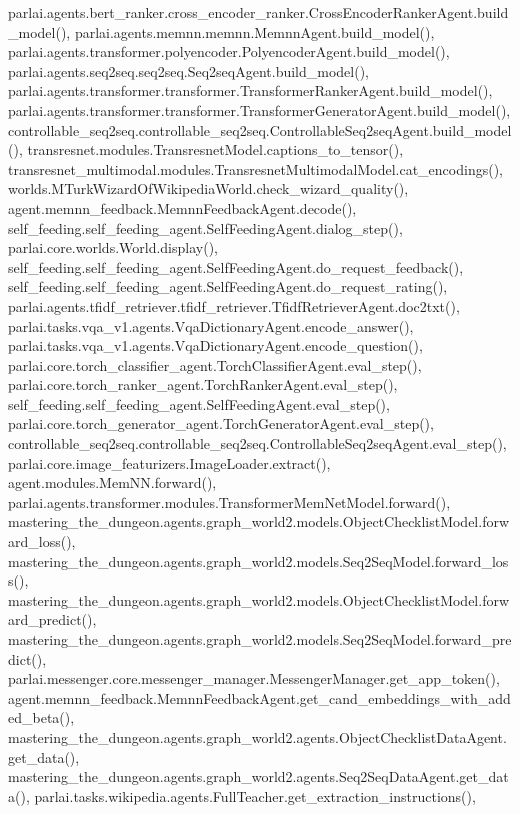parlai.\+agents.\+bert\+\_\+ranker.\+cross\+\_\+encoder\+\_\+ranker.\+Cross\+Encoder\+Ranker\+Agent.\+build\+\_\+model(), parlai.\+agents.\+memnn.\+memnn.\+Memnn\+Agent.\+build\+\_\+model(), parlai.\+agents.\+transformer.\+polyencoder.\+Polyencoder\+Agent.\+build\+\_\+model(), parlai.\+agents.\+seq2seq.\+seq2seq.\+Seq2seq\+Agent.\+build\+\_\+model(), parlai.\+agents.\+transformer.\+transformer.\+Transformer\+Ranker\+Agent.\+build\+\_\+model(), parlai.\+agents.\+transformer.\+transformer.\+Transformer\+Generator\+Agent.\+build\+\_\+model(), controllable\+\_\+seq2seq.\+controllable\+\_\+seq2seq.\+Controllable\+Seq2seq\+Agent.\+build\+\_\+model(), transresnet.\+modules.\+Transresnet\+Model.\+captions\+\_\+to\+\_\+tensor(), transresnet\+\_\+multimodal.\+modules.\+Transresnet\+Multimodal\+Model.\+cat\+\_\+encodings(), worlds.\+M\+Turk\+Wizard\+Of\+Wikipedia\+World.\+check\+\_\+wizard\+\_\+quality(), agent.\+memnn\+\_\+feedback.\+Memnn\+Feedback\+Agent.\+decode(), self\+\_\+feeding.\+self\+\_\+feeding\+\_\+agent.\+Self\+Feeding\+Agent.\+dialog\+\_\+step(), parlai.\+core.\+worlds.\+World.\+display(), self\+\_\+feeding.\+self\+\_\+feeding\+\_\+agent.\+Self\+Feeding\+Agent.\+do\+\_\+request\+\_\+feedback(), self\+\_\+feeding.\+self\+\_\+feeding\+\_\+agent.\+Self\+Feeding\+Agent.\+do\+\_\+request\+\_\+rating(), parlai.\+agents.\+tfidf\+\_\+retriever.\+tfidf\+\_\+retriever.\+Tfidf\+Retriever\+Agent.\+doc2txt(), parlai.\+tasks.\+vqa\+\_\+v1.\+agents.\+Vqa\+Dictionary\+Agent.\+encode\+\_\+answer(), parlai.\+tasks.\+vqa\+\_\+v1.\+agents.\+Vqa\+Dictionary\+Agent.\+encode\+\_\+question(), parlai.\+core.\+torch\+\_\+classifier\+\_\+agent.\+Torch\+Classifier\+Agent.\+eval\+\_\+step(), parlai.\+core.\+torch\+\_\+ranker\+\_\+agent.\+Torch\+Ranker\+Agent.\+eval\+\_\+step(), self\+\_\+feeding.\+self\+\_\+feeding\+\_\+agent.\+Self\+Feeding\+Agent.\+eval\+\_\+step(), parlai.\+core.\+torch\+\_\+generator\+\_\+agent.\+Torch\+Generator\+Agent.\+eval\+\_\+step(), controllable\+\_\+seq2seq.\+controllable\+\_\+seq2seq.\+Controllable\+Seq2seq\+Agent.\+eval\+\_\+step(), parlai.\+core.\+image\+\_\+featurizers.\+Image\+Loader.\+extract(), agent.\+modules.\+Mem\+N\+N.\+forward(), parlai.\+agents.\+transformer.\+modules.\+Transformer\+Mem\+Net\+Model.\+forward(), mastering\+\_\+the\+\_\+dungeon.\+agents.\+graph\+\_\+world2.\+models.\+Object\+Checklist\+Model.\+forward\+\_\+loss(), mastering\+\_\+the\+\_\+dungeon.\+agents.\+graph\+\_\+world2.\+models.\+Seq2\+Seq\+Model.\+forward\+\_\+loss(), mastering\+\_\+the\+\_\+dungeon.\+agents.\+graph\+\_\+world2.\+models.\+Object\+Checklist\+Model.\+forward\+\_\+predict(), mastering\+\_\+the\+\_\+dungeon.\+agents.\+graph\+\_\+world2.\+models.\+Seq2\+Seq\+Model.\+forward\+\_\+predict(), parlai.\+messenger.\+core.\+messenger\+\_\+manager.\+Messenger\+Manager.\+get\+\_\+app\+\_\+token(), agent.\+memnn\+\_\+feedback.\+Memnn\+Feedback\+Agent.\+get\+\_\+cand\+\_\+embeddings\+\_\+with\+\_\+added\+\_\+beta(), mastering\+\_\+the\+\_\+dungeon.\+agents.\+graph\+\_\+world2.\+agents.\+Object\+Checklist\+Data\+Agent.\+get\+\_\+data(), mastering\+\_\+the\+\_\+dungeon.\+agents.\+graph\+\_\+world2.\+agents.\+Seq2\+Seq\+Data\+Agent.\+get\+\_\+data(), parlai.\+tasks.\+wikipedia.\+agents.\+Full\+Teacher.\+get\+\_\+extraction\+\_\+instructions(), 